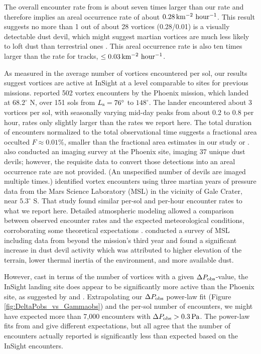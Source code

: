 \documentclass{aastex63}
\begin{document}
The overall encounter rate from \citet{Spiga2021} is about seven times larger than our rate and therefore implies an areal occurrence rate of about $0.28\,{\rm km^{-2}\ hour^{-1}}$. This result suggests no more than 1 out of about 28 vortices (0.28/0.01) is a visually detectable dust devil, which might suggest martian vortices are much less likely to loft dust than terrestrial ones \citep{LORENZ20151}. This areal occurrence rate is also ten times larger than the rate for tracks, $\le 0.03\,{\rm km^{-2}\ hour^{-1}}$.

As measured in the average number of vortices encountered per sol, our results suggest vortices are active at InSight at a level comparable to sites for previous missions. \citet{2010JGRE..115.0E16E} reported 502 vortex encounters by the Phoenix mission, which landed at $68.2^\circ$ N, over 151 sols from $L_{\rm s} = 76^\circ$ to $148^\circ$. The lander encountered about 3 vortices per sol, with seasonally varying mid-day peaks from about 0.2 to 0.8 per hour, rates only slightly larger than the rates we report here. The total duration of encounters normalized to the total observational time suggests a fractional area occulted $F \approx 0.01\%$, smaller than the fractional area estimates in our study or \citet{2021Icar..35514119L}. \citet{2010JGRE..115.0E16E} also conducted an imaging survey at the Phoenix site, imaging 37 unique dust devils; however, the requisite data to convert those detections into an areal occurrence rate are not provided. (An unspecified number of devils are imaged multiple times.) \citet{2019JGRE..124.3442N} identified vortex encounters using three martian years of pressure data from the Mars Science Laboratory (MSL) in the vicinity of Gale Crater, near $5.3^\circ$ S. That study found similar per-sol and per-hour encounter rates to what we report here. Detailed atmospheric modeling allowed a comparison between observed encounter rates and the expected meteorological conditions, corroborating some theoretical expectations \citep{1998JAtS...55.3244R}. \citet{2020Icar..34713814O} conducted a survey of MSL including data from beyond the mission's third year and found a significant increase in dust devil activity which was attributed to higher elevation of the terrain, lower thermal inertia of the environment, and more available dust.

However, cast in terms of the number of vortices with a given $\Delta P_{\rm obs}$-value, the InSight landing site does appear to be significantly more active than the Phoenix site, as suggested by \citet{Spiga2021} and \citet{2021Icar..35514119L}. Extrapolating our $\Delta P_{\rm obs}$ power-law fit (Figure \ref{fig:DeltaPobs_vs_Gammaobs}) and the per-sol number of encounters, we might have expected more than 7,000 encounters with $\Delta P_{\rm obs} > 0.3\,{\rm Pa}$. The power-law fits from \citet{Spiga2021} and \citet{2021Icar..35514119L} give different expectations, but all agree that the number of encounters actually reported is significantly less than expected based on the InSight encounters.
\end{document}
